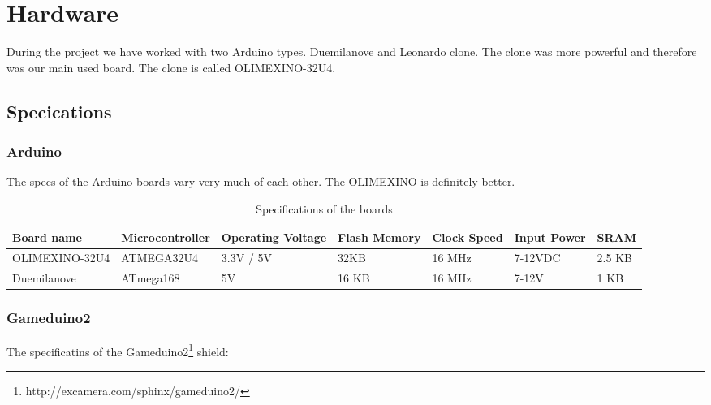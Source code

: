 \section{Hardware}
During the project we have worked with two Arduino types. Duemilanove and Leonardo clone.
The clone was more powerful and therefore was our main used board. The clone is called
OLIMEXINO-32U4.

\subsection{Specications}%

\subsubsection{Arduino}
The specs of the Arduino boards vary very much of each other. The OLIMEXINO is definitely
better.

\begin{table}[h]
\resizebox{16cm}{!} {
    \begin{tabular}{l|l|l|l|l|l|l}
    Board name     & Microcontroller & Operating Voltage & Flash Memory & Clock Speed & Input Power & SRAM   \\ \hline
    OLIMEXINO-32U4 & ATMEGA32U4      & 3.3V / 5V         & 32KB         & 16 MHz      & 7-12VDC     & 2.5 KB \\
    Duemilanove    & ATmega168       & 5V                & 16 KB        & 16 MHz      & 7-12V       & 1 KB   \\
    \end{tabular}
}
    \caption{Specifications of the boards}
\end{table}

\subsubsection{Gameduino2}
The specificatins of the Gameduino2\footnote{http://excamera.com/sphinx/gameduino2/} shield:



